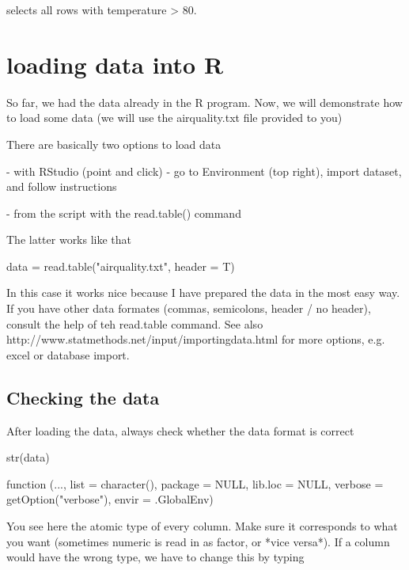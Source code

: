 \documentclass[a4paper,twoside]{tufte-book}\usepackage[]{graphicx}\usepackage[]{color}
\begin{document}
{\begin{appendices}
selects all rows with temperature > 80.


\section{loading data into R}

So far, we had the data already in the R program. Now, we will demonstrate how to load some data (we will use the airquality.txt file provided to you)

There are basically two options to load data

- with RStudio (point and click) - go to Environment (top right), import dataset, and follow instructions

- from the script with the read.table() command

The latter works like that


\begin{Schunk}
\begin{Sinput}
data = read.table("airquality.txt", header = T)
\end{Sinput}
\end{Schunk}

In this case it works nice because I have prepared the data in the most easy way. If you have other data formates (commas, semicolons, header / no header), consult the help of teh read.table command. See also http://www.statmethods.net/input/importingdata.html for more options, e.g. excel or database import. 

\subsection{Checking the data}

After loading the data, always check whether the data format is correct 

\begin{Schunk}
\begin{Sinput}
str(data)
\end{Sinput}
\begin{Soutput}
function (..., list = character(), package = NULL, lib.loc = NULL, 
    verbose = getOption("verbose"), envir = .GlobalEnv)  
\end{Soutput}
\end{Schunk}

You see here the atomic type of every column. Make sure it corresponds to what you want (sometimes numeric is read in as factor, or *vice versa*). If a column would have the wrong type, we have to change this by typing


\end{appendices}}
\end{document}
